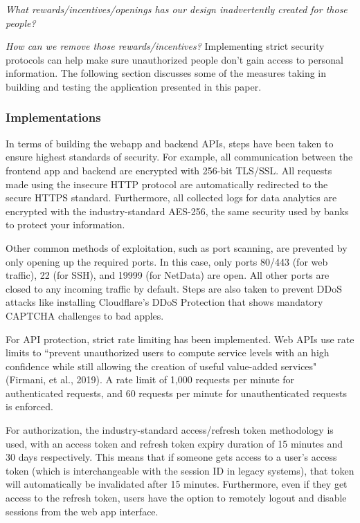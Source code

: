 \documentclass{article}
\begin{document}
\emph{What rewards/incentives/openings has our design inadvertently created for those people?}

\emph{How can we \emph{remove} those rewards/incentives?} Implementing strict security protocols can help make sure unauthorized people don't gain access to personal information. The following section discusses some of the measures taking in building and testing the application presented in this paper.

\subsubsection{Implementations}

In terms of building the webapp and backend APIs, steps have been taken to ensure  highest standards of security. For example, all communication between the frontend app and backend are encrypted with 256-bit TLS/SSL. All requests made using the insecure HTTP protocol are automatically redirected to the secure HTTPS standard. Furthermore, all collected logs for data analytics are encrypted with the industry-standard AES-256, the same security used by banks to protect your information.

Other common methods of exploitation, such as port scanning, are prevented by only opening up the required ports. In this case, only ports 80/443 (for web traffic), 22 (for SSH), and 19999 (for NetData) are open. All other ports are closed to any incoming traffic by default. Steps are also taken to prevent DDoS attacks like installing Cloudflare's DDoS Protection that shows mandatory CAPTCHA challenges to bad apples.

For API protection, strict rate limiting has been implemented. Web APIs use rate limits to ``prevent unauthorized users to compute service levels with an high confidence while still allowing the creation of useful value-added services" (Firmani, et al., 2019). A rate limit of 1,000 requests per minute for authenticated requests, and 60 requests per minute for unauthenticated requests is enforced.

For authorization, the industry-standard access/refresh token methodology is used, with an access token and refresh token expiry duration of 15 minutes and 30 days respectively. This means that if someone gets access to a user's access token (which is interchangeable with the session ID in legacy systems), that token will automatically be invalidated after 15 minutes. Furthermore, even if they get access to the refresh token, users have the option to remotely logout and disable sessions from the web app interface.
\end{document}
